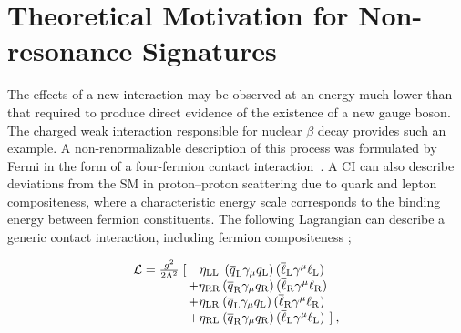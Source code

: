 \section{Theoretical Motivation for Non-resonance Signatures}\label{sec:ciMotivation}

The effects of a new interaction may be observed at an energy much lower than that required to produce direct evidence of the existence of a new gauge boson.
The charged weak interaction responsible for nuclear $\beta$ decay provides such an example.
A non-renormalizable description of this process was formulated by Fermi in the form of a four-fermion contact interaction~\cite{Fermi:1934hr}.
A CI can also describe deviations from the SM in proton--proton scattering due to quark and lepton compositeness, where a characteristic energy scale \lam corresponds to the binding energy between fermion constituents.
The following Lagrangian can describe a generic \llqq contact interaction, including fermion compositeness \cite{eichten, Eichten:1984eu};

\begin{equation}\label{eqn:ciLagrangian}
\begin{array}{r@{\,}c@{}c@{\,}l@{\,}l}
\mathcal L = \frac{g^2}{2\Lambda^2}\;[ && \eta_{\mathrm{LL}}&\, (\overline q_{\mathrm L}\gamma_{\mu} q_{\mathrm L})\,(\overline\ell_{\mathrm L}\gamma^{\mu}\ell_{\mathrm L}) \nonumber \\
& +&\eta_{\mathrm{RR}}& (\overline q_{\mathrm R}\gamma_{\mu} q_{\mathrm R}) \,(\overline\ell_{\mathrm R}\gamma^{\mu}\ell_{\mathrm R}) \\
&+&\eta_{\mathrm{LR}}& (\overline q_{\mathrm L}\gamma_{\mu} q_{\mathrm L}) \,(\overline\ell_{\mathrm R}\gamma^{\mu}\ell_{\mathrm R}) \\
&+&\eta_{\mathrm{RL}}& (\overline q_{\mathrm R}\gamma_{\mu} q_{\mathrm R}) \,(\overline\ell_{\mathrm L}\gamma^{\mu}\ell_{\mathrm L})& ] \: ,\nonumber
\end{array}
\end{equation}

